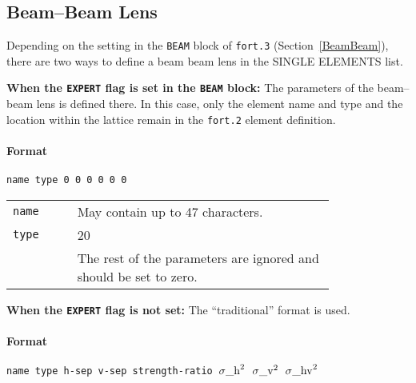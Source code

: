 \subsection{Beam--Beam Lens} \label{BBS}

Depending on the setting in the \texttt{BEAM} block of \texttt{fort.3} (Section~\ref{BeamBeam}), there are two ways to define a beam beam lens in the SINGLE ELEMENTS list.

\bigskip
\noindent\textbf{When the \texttt{EXPERT} flag is set in the \texttt{BEAM} block:}
The parameters of the beam--beam lens is defined there.
In this case, only the element name and type and the location within the lattice remain in the \texttt{fort.2} element definition.

\paragraph{Format} \texttt{name type 0 0 0 0 0 0}

\bigskip
\begin{tabular}{@{}lp{0.8\linewidth}}
    \texttt{name} & May contain up to 47 characters. \\
    \texttt{type} & 20 \\
    \texttt{}     & The rest of the parameters are ignored and should be set to zero.
\end{tabular}

\bigskip
\noindent\textbf{When the \texttt{EXPERT} flag is not set:}
The ``traditional'' format is used.

\paragraph{Format} \texttt{name type h-sep v-sep strength-ratio ${\sigma\_\rm{h}}^2$ ${\sigma\_\rm{v}}^2$ ${\sigma\_\rm{hv}}^2$}

